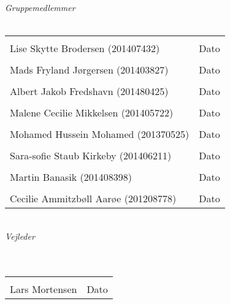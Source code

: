 \begin{vplace}[0.6]
{\large \textit{Gruppemedlemmer}}
\\
\\

\noindent \begin{tabular}{ll}
	\makebox[3.0in]{\hrulefill} & \makebox[1.5in]{\hrulefill}\\
	Lise Skytte Brodersen (201407432) & Dato\\[7ex]%
	\makebox[3in]{\hrulefill} & \makebox[1.5in]{\hrulefill}\\
	Mads Fryland J\o rgersen (201403827) & Dato\\[7ex]
	\makebox[3in]{\hrulefill} & \makebox[1.5in]{\hrulefill}\\
	Albert Jakob Fredshavn (201480425) & Dato\\[7ex]
	\makebox[3in]{\hrulefill} & \makebox[1.5in]{\hrulefill}\\
	Malene Cecilie Mikkelsen (201405722) & Dato\\[7ex]
	\makebox[3in]{\hrulefill} & \makebox[1.5in]{\hrulefill}\\
	Mohamed Hussein Mohamed (201370525) & Dato\\[7ex]
	\makebox[3in]{\hrulefill} & \makebox[1.5in]{\hrulefill}\\
	Sara-sofie Staub Kirkeby (201406211) & Dato\\[7ex]
	\makebox[3in]{\hrulefill} & \makebox[1.5in]{\hrulefill}\\
	Martin Banasik (201408398) & Dato\\[7ex]
	\makebox[3in]{\hrulefill} & \makebox[1.5in]{\hrulefill}\\
	Cecilie Ammitzb\o ll Aar\o e (201208778) & Dato\\[7ex]
	
\end{tabular}
\\
{\large \textit{Vejleder}}
\\
\\
\\
\noindent \begin{tabular}{ll}
	\makebox[3.0in]{\hrulefill} & \makebox[1.5in]{\hrulefill}\\
	Lars Mortensen & Dato\\[8ex]
\end{tabular}
\end{vplace}